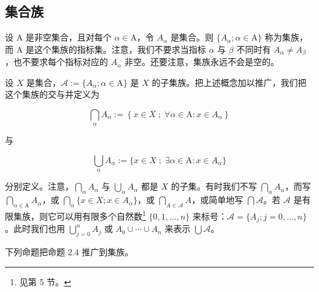 \subsection*{集合族}

设 $\mathrm{A}$ 是非空集合，且对每个 $\alpha \in \mathrm{A}$，令 $A_\alpha$ 是集合。则 $\{A_\alpha; \alpha \in \mathrm{A}\}$ 称为集族，而 $\mathrm{A}$ 是这个集族的指标集。注意，我们不要求当指标 $\alpha$ 与 $\beta$ 不同时有 $A_\alpha \neq A_\beta$，也不要求每个指标对应的 $A_\alpha$ 非空。还要注意，集族永远不会是空的。

设 $X$ 是集合，$\mathcal{A} := \{A_\alpha; \alpha \in \mathrm{A}\}$ 是 $X$ 的子集族。把上述概念加以推广，我们把这个集族的交与并定义为

\[
\bigcap_{\alpha}A_{\alpha}:=\left\{x\in X\;;\;\forall\alpha\in\mathrm{A}\colon x\in A_{\alpha}\right\}
\]

与

\[
\bigcup_{\alpha}A_{\alpha}:=\{x\in X\;;\;\exists\alpha\in\mathrm{A}\colon x\in A_{\alpha}\}
\]

分别定义。注意，$\bigcap_{\alpha} A_{\alpha}$ 与 $\bigcup_{\alpha} A_{\alpha}$ 都是 $X$ 的子集。有时我们不写 $\bigcap_{\alpha} A_{\alpha}$，而写 $\bigcap_{\alpha\in\mathrm{A}} A_{\alpha}$，或 $\bigcap_{\alpha}\{x\in X; x\in A_{\alpha}\}$，或 $\bigcap_{A\in\mathcal{A}} A$，或简单地写 $\bigcap\mathcal{A}$。若 $\mathcal{A}$ 是有限集族，则它可以用有限多个自然数\footnote{见第 5 节。} $\{0,1,\ldots,n\}$ 来标号：$\mathcal{A}=\{A_{j}; j=0,\ldots,n\}$。此时我们也用 $\bigcup_{j=0}^{n} A_{j}$ 或 $A_{0}\cup\cdots\cup A_{n}$ 来表示 $\bigcup\mathcal{A}$。

下列命题把命题 2.4 推广到集族。

